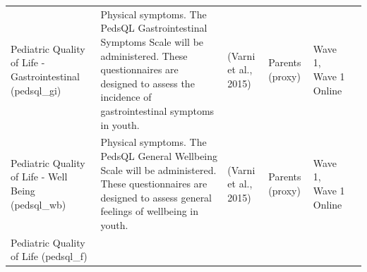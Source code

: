 \documentclass[]{book}
\begin{document}
\begin{longtable}[]{@{}llllll@{}}
\begin{minipage}[t]{0.18\columnwidth}
Pediatric Quality of Life - Gastrointestinal (pedsql\_gi)\strut
\end{minipage} & \begin{minipage}[t]{0.18\columnwidth}\raggedright
Physical symptoms. The PedsQL Gastrointestinal Symptoms Scale will be administered. These questionnaires are designed to assess the incidence of gastrointestinal symptoms in youth.\strut
\end{minipage} & \begin{minipage}[t]{0.15\columnwidth}\raggedright
(Varni et al., 2015)\strut
\end{minipage} & \begin{minipage}[t]{0.16\columnwidth}\raggedright
Parents (proxy)\strut
\end{minipage} & \begin{minipage}[t]{0.06\columnwidth}\raggedright
Wave 1, Wave 1 Online\strut
\end{minipage} & \begin{minipage}[t]{0.10\columnwidth}\raggedright
\strut
\end{minipage}\tabularnewline
\begin{minipage}[t]{0.18\columnwidth}\raggedright
Pediatric Quality of Life - Well Being (pedsql\_wb)\strut
\end{minipage} & \begin{minipage}[t]{0.18\columnwidth}\raggedright
Physical symptoms. The PedsQL General Wellbeing Scale will be administered. These questionnaires are designed to assess general feelings of wellbeing in youth.\strut
\end{minipage} & \begin{minipage}[t]{0.15\columnwidth}\raggedright
(Varni et al., 2015)\strut
\end{minipage} & \begin{minipage}[t]{0.16\columnwidth}\raggedright
Parents (proxy)\strut
\end{minipage} & \begin{minipage}[t]{0.06\columnwidth}\raggedright
Wave 1, Wave 1 Online\strut
\end{minipage} & \begin{minipage}[t]{0.10\columnwidth}\raggedright
\strut
\end{minipage}\tabularnewline
\begin{minipage}[t]{0.18\columnwidth}\raggedright
Pediatric Quality of Life (pedsql\_f)\strut
\end{minipage} & \begin{minipage}[t]{0.18\columnwidth}\raggedright

\end{minipage}
\end{longtable}
\end{document}
